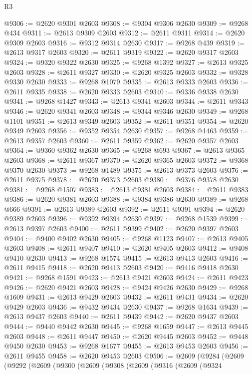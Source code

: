 \begin{lexlean}{R3}
\begin{coremodule}
@9306 := @2620 @9301 @2603
@9308 := @9304 @9306 @2630
@9309 := @9268 @434
@9311 := @2613 @9309 @2603
@9312 := @2611 @9311
@9314 := @2620 @9309 @2603
@9316 := @9312 @9314 @2630
@9317 := @9268 @439
@9319 := @2613 @9317 @2603
@9320 := @2611 @9319
@9322 := @2620 @9317 @2603
@9324 := @9320 @9322 @2630
@9325 := @9268 @1392
@9327 := @2613 @9325 @2603
@9328 := @2611 @9327
@9330 := @2620 @9325 @2603
@9332 := @9328 @9330 @2630
@9333 := @9268 @1079
@9335 := @2613 @9333 @2603
@9336 := @2611 @9335
@9338 := @2620 @9333 @2603
@9340 := @9336 @9338 @2630
@9341 := @9268 @1427
@9343 := @2613 @9341 @2603
@9344 := @2611 @9343
@9346 := @2620 @9341 @2603
@9348 := @9344 @9346 @2630
@9349 := @9268 @1101
@9351 := @2613 @9349 @2603
@9352 := @2611 @9351
@9354 := @2620 @9349 @2603
@9356 := @9352 @9354 @2630
@9357 := @9268 @1463
@9359 := @2613 @9357 @2603
@9360 := @2611 @9359
@9362 := @2620 @9357 @2603
@9364 := @9360 @9362 @2630
@9365 := @9268 @693
@9367 := @2613 @9365 @2603
@9368 := @2611 @9367
@9370 := @2620 @9365 @2603
@9372 := @9368 @9370 @2630
@9373 := @9268 @1489
@9375 := @2613 @9373 @2603
@9376 := @2611 @9375
@9378 := @2620 @9373 @2603
@9380 := @9376 @9378 @2630
@9381 := @9268 @1507
@9383 := @2613 @9381 @2603
@9384 := @2611 @9383
@9386 := @2620 @9381 @2603
@9388 := @9384 @9386 @2630
@9389 := @9268 @666
@9391 := @2613 @9389 @2603
@9392 := @2611 @9391
@9394 := @2620 @9389 @2603
@9396 := @9392 @9394 @2630
@9397 := @9268 @1539
@9399 := @2613 @9397 @2603
@9400 := @2611 @9399
@9402 := @2620 @9397 @2603
@9404 := @9400 @9402 @2630
@9405 := @9268 @1123
@9407 := @2613 @9405 @2603
@9408 := @2611 @9407
@9410 := @2620 @9405 @2603
@9412 := @9408 @9410 @2630
@9413 := @9268 @1574
@9415 := @2613 @9413 @2603
@9416 := @2611 @9415
@9418 := @2620 @9413 @2603
@9420 := @9416 @9418 @2630
@9421 := @9268 @1591
@9423 := @2613 @9421 @2603
@9424 := @2611 @9423
@9426 := @2620 @9421 @2603
@9428 := @9424 @9426 @2630
@9429 := @9268 @1609
@9431 := @2613 @9429 @2603
@9432 := @2611 @9431
@9434 := @2620 @9429 @2603
@9436 := @9432 @9434 @2630
@9437 := @9268 @1634
@9439 := @2613 @9437 @2603
@9440 := @2611 @9439
@9442 := @2620 @9437 @2603
@9444 := @9440 @9442 @2630
@9445 := @9268 @1659
@9447 := @2613 @9445 @2603
@9448 := @2611 @9447
@9450 := @2620 @9445 @2603
@9452 := @9448 @9450 @2630
@9453 := @9268 @1677
@9455 := @2613 @9453 @2603
@9456 := @2611 @9455
@9458 := @2620 @9453 @2603
@9506 := @2609
    (@9284
      (@2609
        (@9292
          (@2609
            (@9300
              (@2609
                (@9308
                  (@2609
                    (@9316
                      (@2609
                        (@9324

\end{coremodule}
\end{lexlean}

